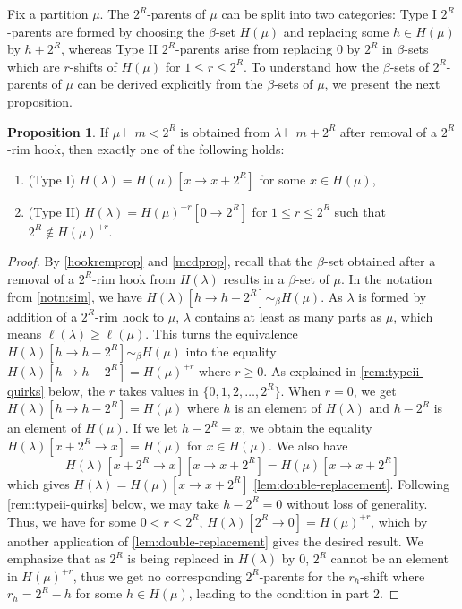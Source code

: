 \documentclass[12pt]{amsart}
\theoremstyle{definition}
\newtheorem{proposition}[theorem]{Proposition}
\numberwithin{equation}{section}
\newcommand{\la}{\lambda}
\begin{document}
Fix a partition $\mu$. The $2^R$-parents of $\mu$ can be split into two categories: Type I $2^R$-parents are formed by choosing the $\beta$-set $H(\mu)$ and replacing some $h\in H(\mu)$ by $h+2^R$, whereas Type II $2^R$-parents arise from replacing $0$ by $2^R$ in $\beta$-sets which are $r$-shifts of $H(\mu)$ for $1\leq r \leq 2^R$. To understand how the $\beta$-sets of $2^R$-parents of $\mu$ can be derived explicitly from the $\beta$-sets of $\mu$, we present the next proposition.
\begin{proposition}\label{parents}
If $\mu \vdash m < 2^R$ is obtained from $\lambda\vdash m+2^R$ after removal of a $2^R$-rim hook, then exactly one of the following holds:
\begin{enumerate}
\item (Type I) $H(\lambda) = H(\mu)[x\to x+2^R]$ for some $x\in H(\mu)$,
\item (Type II) $H(\lambda) = H(\mu)^{+r}[0\to 2^R]$ for $1\leq r\leq 2^R$ such that $2^R\not\in H(\mu)^{+r}$.
\end{enumerate}
\end{proposition}
\begin{proof}
By \cref{hookremprop} and \cref{mcdprop}, recall that the $\beta$-set obtained after a removal of a $2^R$-rim hook from $H(\la)$ results in a $\beta$-set of $\mu$. In the notation from \cref{notn:sim},  we have $H(\lambda)[h \to h-2^R]\sim_{\beta}H(\mu)$. As $\lambda$ is formed by addition of a $2^R$-rim hook to $\mu$, $\lambda$ contains at least as many parts as $\mu$, which means $\ell(\la) \geq \ell(\mu)$. This turns the equivalence $H(\lambda)[h \to h-2^R]\sim_{\beta}H(\mu)$ into the equality $H(\lambda)[h\to h-2^R] = H(\mu)^{+r}$ where $r\geq 0$. As explained in \cref{rem:typeii-quirks} below, the $r$ takes values in $\{0,1,2,\ldots,2^{R}\}$. When $r =0$, we get $H(\lambda)[h\to h-2^R] = H(\mu)$ where $h$ is an element of $H(\la)$ and $h-2^{R}$ is an element of $H(\mu)$. If we let $h - 2^R = x$, we obtain the equality $H(\la)[x+2^R \to x] = H(\mu)$ for $x\in H(\mu)$. We also have
\[
H(\la)[x+2^R \to x][x\to x+2^R] = H(\mu)[x\to x+2^R]
\] 
which gives $H(\la)= H(\mu)[x\to x+2^R]$ \cref{lem:double-replacement}. 
Following \cref{rem:typeii-quirks} below, we may take $h - 2^R = 0$ without loss of generality. Thus, we have for some $0 < r \leq 2^R$, $H(\la)[2^R\to 0] = H(\mu)^{+r}$, which by another application of \cref{lem:double-replacement} gives the desired result. We emphasize that as $2^R$ is being replaced in $H(\la)$ by 0, $2^R$ cannot be an element in $H(\mu)^{+r}$, thus we get no corresponding $2^R$-parents for the $r_h$-shift where $r_h = 2^R-h$ for some $h\in H(\mu)$, leading to the condition in part 2.
\end{proof}
\end{document}
